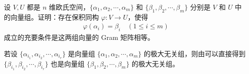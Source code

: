 \documentclass[../../main.tex]{subfiles}
\begin{document}
\begin{proposition}\label{proposition:例9.38}
设 \(V,U\) 都是 \(n\) 维欧氏空间，\(\{\alpha_1,\alpha_2,\cdots,\alpha_m\}\) 和 \(\{\beta_1,\beta_2,\cdots,\beta_m\}\) 分别是 \(V\) 和 \(U\) 中的向量组。证明：存在保积同构 \(\varphi:V \to U\)，使得
\begin{align*}
\varphi(\alpha_i) = \beta_i\quad (1\leqslant  i \leqslant  m)
\end{align*}
成立的充要条件是这两组向量的 Gram 矩阵相等。
\end{proposition}
\begin{remark}
若设 \(\{\alpha_{i_1},\alpha_{i_2},\cdots,\alpha_{i_r}\}\) 是向量组 \(\{\alpha_1,\alpha_2,\cdots,\alpha_m\}\) 的极大无关组，则由可以直接得到 \(\{\beta_{i_1},\beta_{i_2},\cdots,\beta_{i_r}\}\) 也是向量组 \(\{\beta_1,\beta_2,\cdots,\beta_m\}\) 的极大无关组。 
\end{remark}
\end{document}
